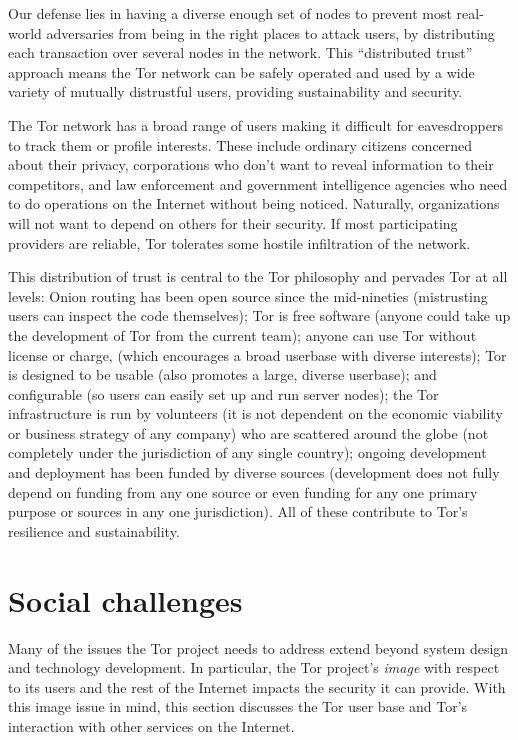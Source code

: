 \documentclass{llncs}
\begin{document}
Our defense lies in having a diverse enough set of nodes to prevent
most real-world adversaries from being in the right places to attack
users, by distributing each transaction over several nodes in the
network.  This ``distributed trust'' approach means the Tor network
can be safely operated and used by a wide variety of mutually
distrustful users, providing sustainability and security.

The Tor network has a broad range of users making it difficult for
eavesdroppers to track them or profile interests. These include
ordinary citizens concerned about their privacy, corporations who
don't want to reveal information to their competitors, and law
enforcement and government intelligence agencies who need to do
operations on the Internet without being noticed.  Naturally,
organizations will not want to depend on others for their security.
If most participating providers are reliable, Tor tolerates some
hostile infiltration of the network.

This distribution of trust is central to the Tor philosophy and
pervades Tor at all levels: Onion routing has been open source since
the mid-nineties (mistrusting users can inspect the code themselves);
Tor is free software (anyone could take up the development of Tor from
the current team); anyone can use Tor without license or charge, (which
encourages a broad userbase with diverse interests); Tor is designed to be
usable (also promotes a large, diverse userbase); and configurable (so
users can easily set up and run server nodes); the Tor
infrastructure is run by volunteers (it is not dependent on the
economic viability or business strategy of any company) who are
scattered around the globe (not completely under the jurisdiction of
any single country); ongoing development and deployment has been
funded by diverse sources (development does not fully depend on
funding from any one source or even funding for any one primary
purpose or sources in any one jurisdiction). All of these contribute
to Tor's resilience and sustainability.


\section{Social challenges}

Many of the issues the Tor project needs to address extend beyond
system design and technology development. In particular, the Tor
project's \emph{image} with respect to its users and the rest of the
Internet impacts the security it can provide.  With this image issue
in mind, this section discusses the Tor user base and Tor's
interaction with other services on the Internet.
\end{document}
